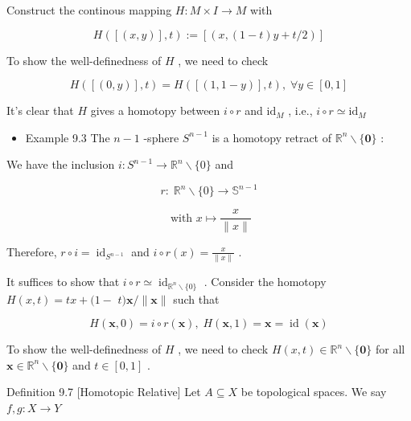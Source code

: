 Construct the continous mapping \(H : M \times  I \rightarrow  M\) with

\[
H\left( {\left\lbrack  \left( {x,y}\right) \right\rbrack  ,t}\right)  \mathrel{\text{ := }} \left\lbrack  \left( {x,\left( {1 - t}\right) y + t/2}\right) \right\rbrack
\]

To show the well-definedness of \(H\) , we need to check

\[
H\left( {\left\lbrack  \left( {0,y}\right) \right\rbrack  ,t}\right)  = H\left( {\left\lbrack  \left( {1,1 - y}\right) \right\rbrack  ,t}\right) ,\;\forall y \in  \left\lbrack  {0,1}\right\rbrack
\]

It’s clear that \(H\) gives a homotopy between \(i \circ  r\) and \({\mathrm{{id}}}_{M}\) , i.e., \(i \circ  r \simeq  {\mathrm{{id}}}_{M}\)

\begin{itemize}
\item Example 9.3 The \(n - 1\) -sphere \({S}^{n - 1}\) is a homotopy retract of \({\mathbb{R}}^{n} \smallsetminus  \{ \mathbf{0}\}\) :
\end{itemize}

We have the inclusion \(i : {S}^{n - 1} \rightarrow  {\mathbb{R}}^{n} \smallsetminus  \{ 0\}\) and

\[
r : \;{\mathbb{R}}^{n} \smallsetminus  \{ 0\}  \rightarrow  {\mathbb{S}}^{n - 1}
\]

\[
\text{ with }x \mapsto  \frac{x}{\parallel x\parallel }
\]

Therefore, \(r \circ  i = {\operatorname{id}}_{{S}^{n - 1}}\) and \(i \circ  r\left( x\right)  = \frac{x}{\parallel x\parallel }\) .

It suffices to show that \(i \circ  r \simeq  {\operatorname{id}}_{{\mathbb{R}}^{n}\smallsetminus \{ 0\} }\) . Consider the homotopy \(H\left( {x,t}\right)  = {tx} + (1 -\)  \(t)\mathbf{x}/\parallel \mathbf{x}\parallel\) such that

\[
H\left( {\mathbf{x},0}\right)  = i \circ  r\left( \mathbf{x}\right) ,\;H\left( {\mathbf{x},1}\right)  = \mathbf{x} = \operatorname{id}\left( \mathbf{x}\right)
\]

To show the well-definedness of \(H\) , we need to check \(H\left( {x,t}\right)  \in  {\mathbb{R}}^{n} \smallsetminus  \{ \mathbf{0}\}\) for all \(\mathbf{x} \in  {\mathbb{R}}^{n} \smallsetminus  \{ \mathbf{0}\}\) and \(t \in  \left\lbrack  {0,1}\right\rbrack\) .

Definition 9.7 [Homotopic Relative] Let \(A \subseteq  X\) be topological spaces. We say \(f,g : X \rightarrow  Y\)

